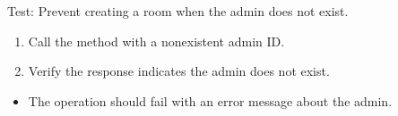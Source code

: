 \documentclass[letterpaper,10pt,english]{sphinxmanual}
\begin{document}
\begin{fulllineitems}
\label{\detokenize{test:test.test_room.test_create_room_admin_not_exist}}
\pysigstartsignatures
\pysiglinewithargsret
{}
{}
{}
\pysigstopsignatures
\sphinxAtStartPar
Test: Prevent creating a room when the admin does not exist.
\begin{description}
\begin{enumerate}
%
\item {} 
\sphinxAtStartPar
Call the  method with a nonexistent admin ID.

\item {} 
\sphinxAtStartPar
Verify the response indicates the admin does not exist.

\end{enumerate}

\begin{itemize}
\item {} 
\sphinxAtStartPar
The operation should fail with an error message about the admin.

\end{itemize}

\end{description}

\end{fulllineitems}

\end{document}
